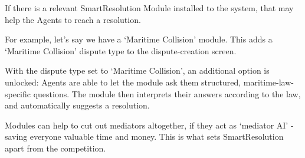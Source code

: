 If there is a relevant SmartResolution Module installed to the system, that may help the Agents to reach a resolution.

For example, let's say we have a `Maritime Collision' module. This adds a `Maritime Collision' dispute type to the dispute-creation screen.

With the dispute type set to `Maritime Collision', an additional option is unlocked: Agents are able to let the module ask them structured, maritime-law-specific questions. The module then interprets their answers according to the law, and automatically suggests a resolution.

Modules can help to cut out mediators altogether, if they act as `mediator AI' - saving everyone valuable time and money. This is what sets SmartResolution apart from the competition.